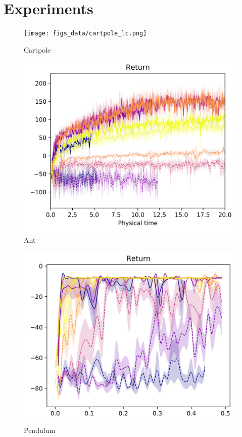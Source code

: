 \section{Experiments}
\label{sec:exp}



\begin{figure}[h]
  \centering
  \texttt{[image: figs\_data/cartpole\_lc.png]}
  \caption{Cartpole}
  \label{fig:cartpole-lc}
\end{figure}

\begin{figure}[h]
  \centering
  \includegraphics[width=\columnwidth]{figs_data/ant_lc.png}
  \caption{Ant}
  \label{fig:ant-lc}
\end{figure}

\begin{figure}[h]
  \centering
  \includegraphics[width=\columnwidth]{figs_data/pendulum_lc.png}
  \caption{Pendulum}
  \label{fig:pendulum-lc}
\end{figure}
